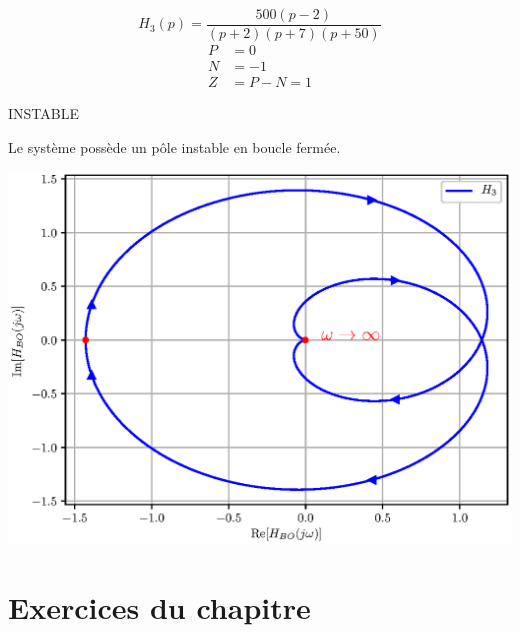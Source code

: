 \begin{minipage}{0.35\textwidth}
\[
        H_3(p)=\dfrac{500(p-2)}{(p+2)(p+7)(p+50)}
\]
    \begin{align*}
        P&=0\\
        N&=-1\\
        Z&=P-N=1
    \end{align*}

{
       \hfill\LARGE\textcolor{col4}{INSTABLE}\hfill
}
    
    Le système possède un pôle instable en boucle fermée.
\end{minipage}
\begin{minipage}{0.65\textwidth}
\begin{center}
\includegraphics[width=\textwidth]{fig/chap_stab_h3.eps}
\end{center}
\end{minipage}

\clearpage
\section{Exercices du chapitre}
\small

\setcounter{numexos}{0}
\normalsize
\newpage
\restoregeometry
\captionsetup{width=0.9\linewidth}
